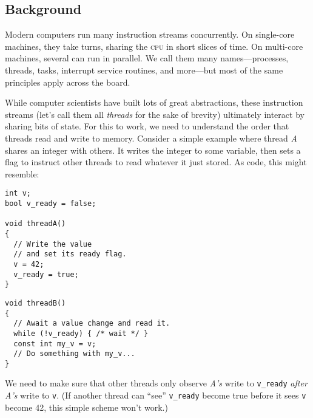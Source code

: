 \documentclass[fontsize=\bodyfontsize, numbers=endperiod]{scrartcl}
\newcommand{\codesize}{\fontsize{\bodyfontsize}{\bodybaselineskip}}
\newenvironment{colfigure}
  {\par\vspace{1\baselineskip minus 0.5\baselineskip}\noindent\minipage{\linewidth}}
  {\endminipage\vspace{1\baselineskip minus 0.7\baselineskip}}
\begin{document}
\begin{multicols}{2}
\section{Background}
\label{background}

Modern computers run many instruction streams concurrently.
On single-core machines, they take turns,
sharing the \textsc{cpu} in short slices of time.
On multi-core machines, several can run in parallel.
We call them many names---processes, threads, tasks,
interrupt service routines, and more---but most of the same principles apply
across the board.

While computer scientists have built lots of great abstractions,
these instruction streams
(let's call them all \emph{threads} for the sake of brevity)
ultimately interact by sharing bits of state.
For this to work, we need to understand the order that
threads read and write to memory.
Consider a simple example where thread \textit{A} shares
an integer with others.
It writes the integer to some variable,
then sets a flag to instruct other threads to read whatever it just stored.
As code, this might resemble:
\begin{colfigure}
\begin{verbatim}
int v;
bool v_ready = false;

void threadA()
{
  // Write the value
  // and set its ready flag.
  v = 42;
  v_ready = true;
}
\end{verbatim}
\end{colfigure}
\begin{colfigure}
\begin{verbatim}
void threadB()
{
  // Await a value change and read it.
  while (!v_ready) { /* wait */ }
  const int my_v = v;
  // Do something with my_v...
}
\end{verbatim}
\end{colfigure}
We need to make sure that other threads only observe \textit{A's} write to
\texttt{v\_ready}
\emph{after A's} write to \texttt{v}.
(If another thread can ``see'' \texttt{v\_ready} become true before it sees
\texttt{v} become 42, this simple scheme won't work.)


\end{multicols}
\end{document}
